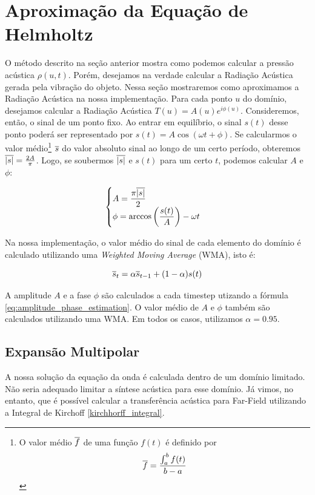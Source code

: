 \section {Aproximação da Equação de Helmholtz}

O método descrito na seção anterior mostra como podemos calcular a pressão acústica $\rho(u, t)$. Porém, desejamos na verdade calcular a Radiação Acústica gerada pela vibração do objeto. Nessa seção mostraremos como aproximamos a Radiação Acústica na nossa implementação.
Para cada ponto $u$ do domínio, desejamos calcular a Radiação Acústica $T(u) = A(u)e^{i\phi(u)}$. Consideremos, então, o sinal de um ponto fixo. Ao entrar em equilíbrio, o sinal $s(t)$ desse ponto poderá ser representado por $s(t) = A \cos(\omega t + \phi)$. Se calcularmos o valor médio\footnote{O valor médio $\overline{f}$ de uma função $f(t)$ é definido por $$\overline{f} = \frac{\int_a^b f(t)}{b-a}$$} $\overline{s}$ do valor absoluto sinal ao longo de um certo período, obteremos $\overline{|s|} = \frac{2A}{\pi}$. Logo, se soubermos $\overline{|s|}$ e $s(t)$ para um certo $t$, podemos calcular $A$ e $\phi$: 

\begin{equation}
	\begin{cases}
		A = \dfrac{\pi\overline{|s|}}{2}\\
		\phi = \arccos \left(\dfrac{s(t)}{A}\right) - \omega t
	\end{cases}
	\label{eq:amplitude_phase_estimation}
\end{equation}

Na nossa implementação, o valor médio do sinal de cada elemento do domínio é calculado utilizando uma \emph{Weighted Moving Average} (WMA), isto é:

\begin{equation}
	\overline{s}_{t} = \alpha\overline{s}_{t-1} + (1-\alpha)s(t)
\end{equation}

A amplitude $A$ e a fase $\phi$ são calculados a cada timestep utizando a fórmula \eqref{eq:amplitude_phase_estimation}. O valor médio de $A$ e $\phi$ também são calculados utilizando uma WMA. Em todos os casos, utilizamos $\alpha = 0.95$.

\subsection{Expansão Multipolar}

A nossa solução da equação da onda é calculada dentro de um domínio limitado. Não seria adequado limitar a síntese acústica para esse domínio. Já vimos, no entanto, que é possível calcular a transferência acústica para Far-Field utilizando a Integral de Kirchoff \eqref{kirchhorff_integral}.

